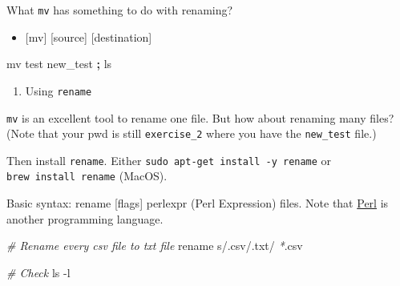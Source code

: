 \documentclass[
]{book}
\newenvironment{Shaded}{\begin{snugshade}}{\end{snugshade}}
\newcommand{\AttributeTok}[1]{\textcolor[rgb]{0.77,0.63,0.00}{#1}}
\newcommand{\CommentTok}[1]{\textcolor[rgb]{0.56,0.35,0.01}{\textit{#1}}}
\newcommand{\ControlFlowTok}[1]{\textcolor[rgb]{0.13,0.29,0.53}{\textbf{#1}}}
\newcommand{\DataTypeTok}[1]{\textcolor[rgb]{0.13,0.29,0.53}{#1}}
\newcommand{\DecValTok}[1]{\textcolor[rgb]{0.00,0.00,0.81}{#1}}
\newcommand{\ExtensionTok}[1]{#1}
\newcommand{\FunctionTok}[1]{\textcolor[rgb]{0.00,0.00,0.00}{#1}}
\newcommand{\KeywordTok}[1]{\textcolor[rgb]{0.13,0.29,0.53}{\textbf{#1}}}
\newcommand{\NormalTok}[1]{#1}
\newcommand{\PreprocessorTok}[1]{\textcolor[rgb]{0.56,0.35,0.01}{\textit{#1}}}
\newcommand{\StringTok}[1]{\textcolor[rgb]{0.31,0.60,0.02}{#1}}
\newcommand{\VariableTok}[1]{\textcolor[rgb]{0.00,0.00,0.00}{#1}}
\providecommand{\tightlist}{%
  \setlength{\itemsep}{0pt}\setlength{\parskip}{0pt}}
\begin{document}
What \texttt{mv} has something to do with renaming?

\begin{itemize}
\tightlist
\item
  {[}mv{]} {[}source{]} {[}destination{]}
\end{itemize}

\begin{Shaded}
\begin{Highlighting}[]

\FunctionTok{mv}\NormalTok{ test new\_test }\KeywordTok{;} \FunctionTok{ls} 
\end{Highlighting}
\end{Shaded}

\begin{enumerate}
\def\labelenumi{\arabic{enumi}.}
\setcounter{enumi}{1}
\tightlist
\item
  Using \texttt{rename}
\end{enumerate}

\texttt{mv} is an excellent tool to rename one file. But how about renaming many files? (Note that your pwd is still \texttt{exercise\_2} where you have the \texttt{new\_test} file.)

\begin{Shaded}
\end{Shaded}

Then install \texttt{rename}. Either \texttt{sudo\ apt-get\ install\ -y\ rename} or \texttt{brew\ install\ rename} (MacOS).

Basic syntax: rename {[}flags{]} perlexpr (Perl Expression) files. Note that \href{https://en.wikipedia.org/wiki/Perl}{Perl} is another programming language.

\begin{Shaded}
\begin{Highlighting}[]
\CommentTok{\# Rename every csv file to txt file }
\ExtensionTok{rename} \StringTok{\textquotesingle{}s/.csv/.txt/\textquotesingle{}} \PreprocessorTok{*}\NormalTok{.csv}

\CommentTok{\# Check }
\FunctionTok{ls} \AttributeTok{{-}l}
\end{Highlighting}
\end{Shaded}
\end{document}

